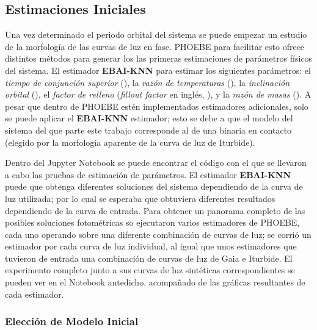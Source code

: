 \subsection{Estimaciones Iniciales}
\label{metodologia:modelocomputacional:estimacionesiniciales}

Una vez determinado el periodo orbital del sistema se puede empezar un estudio
de la morfología de las curvas de luz en fase. PHOEBE para facilitar esto ofrece
distintos métodos para generar los las primeras estimaciones de parámetros
físicos del sistema. El estimador \textbf{EBAI-KNN} para estimar los siguientes
parámetros: el \textit{tiempo de conjunción superior} (), la
\textit{razón de temperaturas} (), la \textit{inclinación
orbital} (), el \textit{factor de relleno}
(\textit{fillout factor} en inglés, ), y la
\textit{razón de masas} (). A pesar que dentro de PHOEBE estén
implementados estimadores adicionales, solo se puede aplicar el
\textbf{EBAI-KNN} estimador; esto se debe a que el modelo del sistema del que
parte este trabajo corresponde al de una binaria en contacto (elegido por la
morfología aparente de la curva de luz de Iturbide).

Dentro del Jupyter Notebook
\href{https://github.com/KnightIV/UANL_MAPTA_PlanObservaciones/blob/main/analisis/phoebe_model/estimations/ebai-default.ipynb}{}
se puede encontrar el código con el que se llevaron a cabo las pruebas de
estimación de parámetros. El estimador \textbf{EBAI-KNN} puede que obtenga
diferentes soluciones del sistema dependiendo de la curva de luz utilizada; por
lo cual se esperaba que obtuviera diferentes resultados dependiendo de la curva
de entrada. Para obtener un panorama completo de las posibles soluciones
fotométricas so ejecutaron varios estimadores de PHOEBE, cada uno operando sobre
una diferente combinación de curvas de luz; se corrió un estimador por cada
curva de luz individual, al igual que unos estimadores que tuvieron de entrada
una combinación de curvas de luz de Gaia e Iturbide. El experimento completo
junto a sus curvas de luz sintéticas correspondientes se pueden ver en el
Notebook antedicho, acompañado de las gráficas resultantes de cada estimador.

\subsubsection{Elección de Modelo Inicial}
\label{metodologia:modelocomputacional:estimacionesiniciales:eligiendomodeloinicial}

